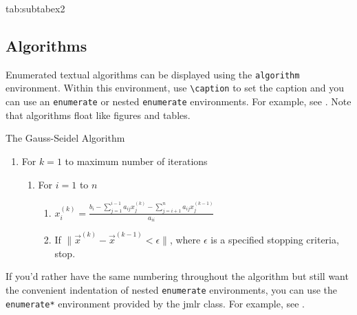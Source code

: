 \documentclass[pmlr]{jmlr}%
\begin{document}
\begin{table}[htbp]
\floatconts
 {tab:subtabex2}
 {\caption{Another Example With Sub-Tables}}
 {%
   \qquad
 }
\end{table}

\subsection{Algorithms}
\label{sec:algorithms}

Enumerated textual algorithms can be displayed using the
\texttt{algorithm} environment. Within this environment, use
\verb|\caption| to set the caption and you can use an
\texttt{enumerate} or nested \texttt{enumerate} environments.
For example, see . Note that algorithms
float like figures and tables.

\begin{algorithm}[htbp]
\caption{The Gauss-Seidel Algorithm}\label{alg:gauss}
\begin{enumerate}
  \item For $k=1$ to maximum number of iterations
    \begin{enumerate}
      \item For $i=1$ to $n$
        \begin{enumerate}
        \item $x_i^{(k)} = 
          \frac{b_i - \sum_{j=1}^{i-1}a_{ij}x_j^{(k)}
          - \sum_{j=i+1}^{n}a_{ij}x_j^{(k-1)}}{a_{ii}}$
        \item If $\|\vec{x}^{(k)}-\vec{x}^{(k-1)} < \epsilon\|$,
          where $\epsilon$ is a specified stopping criteria, stop.
      \end{enumerate}
    \end{enumerate}
\end{enumerate}
\end{algorithm}

If you'd rather have the same numbering throughout the algorithm
but still want the convenient indentation of nested 
\texttt{enumerate} environments, you can use the
\texttt{enumerate*} environment provided by the \textsf{jmlr}
class. For example, see .
\end{document}
